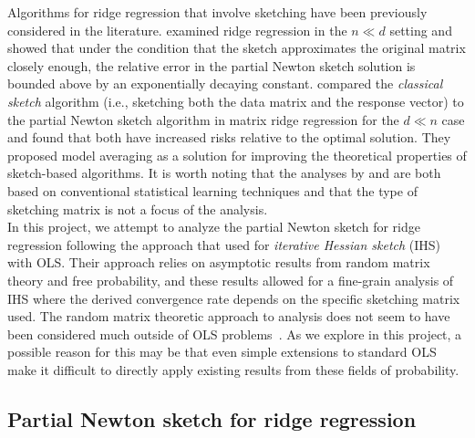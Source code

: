 Algorithms for ridge regression that involve sketching have been previously considered in the literature. \citet{Chowdhury:2018} examined ridge regression in the $n\ll d$ setting and showed that under the condition that the sketch approximates the original matrix closely enough, the relative error in the partial Newton sketch solution is bounded above by an exponentially decaying constant. \citet{Wang:2017} compared the \textit{classical sketch} algorithm (i.e., sketching both the data matrix and the response vector) to the partial Newton sketch algorithm in matrix ridge regression for the $d\ll n$ case and found that both have increased risks relative to the optimal solution. They proposed model averaging as a solution for improving the theoretical properties of sketch-based algorithms. It is worth noting that the analyses by \citet{Chowdhury:2018} and \citet{Wang:2017} are both based on conventional statistical learning techniques and that the type of sketching matrix is not a focus of the analysis.
\\

In this project, we attempt to analyze the partial Newton sketch for ridge regression following the approach that \citet{Lacotte:2020} used for \textit{iterative Hessian sketch} (IHS)~\citep{Pilanci:2016} with OLS. Their approach relies on asymptotic results from random matrix theory and free probability, and these results allowed for a fine-grain analysis of IHS where the derived convergence rate depends on the specific sketching matrix used. The random matrix theoretic approach to analysis does not seem to have been considered much outside of OLS problems~\citep{Dobriban:2019,Lacotte:2020b}. As we explore in this project, a possible reason for this may be that even simple extensions to standard OLS make it difficult to directly apply existing results from these fields of probability.


\subsection{Partial Newton sketch for ridge regression} \label{sec:ridgesketch}

